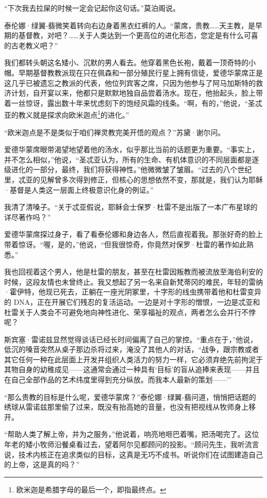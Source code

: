 \documentclass[AutoFakeBold=true]{book}
\begin{document}
``下次我去拉屎的时候一定会记起你这句话。''莫泊阁说。

泰伦娜·绿翼-翡微笑着转向右边身着黑衣红裤的人。``蒙席，贵教……天主教，是早期的基督教，对吧？……关于人类达到一个更高位的进化形态，您定是有什么可喜的古老教义吧？''

我们都转头朝这名矮小、沉默的男人看去。他穿着黑色长袍，戴着一顶奇特的小帽。早期基督教教派现在只在佩森和一部分殖民行星上拥有信徒，爱德华蒙席正是这几乎已被遗忘之教派的代表，他位列宾客之席，只因为他参与了阿马加斯特的救济计划，自开宴以来，他都只是默默地独自品尝着汤水。现在，他抬起头，脸上带着一丝惊讶，露出数十年来忧虑刻下的饱经风霜的线条。``啊，有的，''他说，``圣忒亚的教义就是探求向欧米迦点\footnote{欧米迦是希腊字母的最后一个，即指最终点。}的进化。''

``欧米迦点是不是类似于咱们禅灵教完美开悟的观点？''苏黛·谢尔问。

爱德华蒙席眼带渴望地望着他的汤水，似乎那比当前的话题更为重要。``事实上，并不怎么相似，''他说，``圣忒亚认为，所有的生命、有机体意识的不同层面都是逐级进化的一部分，最终，我们将获得神性。''他微微皱了皱眉。``过去的八个世纪里，忒亚的见解曾多次得到修正，但核心的思想依然不变，那就是，我们认为耶稣·基督是人类这一层面上终极意识化身的例证。''

我清了清嗓子。``关于忒亚假说，耶稣会士保罗·杜雷不是出版了一本广布星球的详尽著作吗？''

爱德华蒙席探过身子，看了看泰伦娜和身边各人，然后直视着我。那张好奇的脸上带着惊讶。``喔，是的，''他说，``但我很惊奇，你竟然对保罗·杜雷的著作如此熟悉。''

我也回视着这个男人，他是杜雷的朋友，甚至在杜雷因叛教而被流放至海伯利安的时候，这段友情也未曾终止。我又想起了另一名来自新梵蒂冈的难民，年轻的雷纳·霍伊特，他现已死去，正躺在一座光阴冢里，十字形的线虫携带着他和杜雷变异的 DNA，正在开展它们残忍的复活运动。一边是对十字形的憎恨，一边是忒亚和杜雷关于人类会不可避免地向神性进化、荣享福祉的观点，两者怎么会并行不悖呢？

斯宾塞·雷诺兹显然觉得谈话已经长时间偏离了自己的掌控。``重点在于，''他说，低沉的嗓音突然从桌子那边杀将过来，淹没了其他人的对话，``战争，跟宗教或者其它任何一种在此层面上开发并组织人类活力的努力一样，它必须弃绝先前拘泥于{\kaishu 其物自身}的幼稚成见——这通常会通过一种具有`目标'的盲从追捧来表现——并且在自己全部作品的艺术纬度里得到充分纵放。而我本人最新的策划——''

``那么贵教的目标是什么呢，爱德华蒙席？''泰伦娜·绿翼-翡问道，悄悄把话题的绣球从雷诺兹那里偷了过来，既没有抬高她的音量，也没有把视线从牧师身上移开。

``帮助人类了解上帝，并为之服务，''他说着，响亮地咂巴着嘴，把汤喝完了。这位年老的矮小牧师沿餐桌看过去，望着阿尔见都顾问的投影。``顾问先生，我听流言说，技术内核正在追求类似的目标，这真是无巧不成书。听说你们在试图建造自己的上帝，这是真的吗？''
\end{document}
